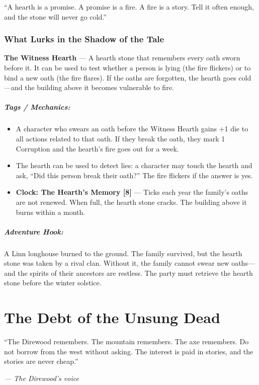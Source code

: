 \documentclass[9pt,a5paper]{extbook}
\begin{document}
``A hearth is a promise. A promise is a fire. A fire is a story. Tell it often enough, and the stone will never go cold.''

\subsection*{What Lurks in the Shadow of the Tale}

\textbf{The Witness Hearth} --- A hearth stone that remembers every oath sworn before it. It can be used to test whether a person is lying (the fire flickers) or to bind a new oath (the fire flares). If the oaths are forgotten, the hearth goes cold---and the building above it becomes vulnerable to fire.

\paragraph{Tags / Mechanics:}
\begin{itemize}
    \item A character who swears an oath before the Witness Hearth gains +1 die to all actions related to that oath. If they break the oath, they mark 1 Corruption and the hearth's fire goes out for a week.
    \item The hearth can be used to detect lies: a character may touch the hearth and ask, ``Did this person break their oath?'' The fire flickers if the answer is yes.
    \item \textbf{Clock: The Hearth's Memory [8]} --- Ticks each year the family's oaths are not renewed. When full, the hearth stone cracks. The building above it burns within a month.
\end{itemize}

\paragraph{Adventure Hook:}
A Linn longhouse burned to the ground. The family survived, but the hearth stone was taken by a rival clan. Without it, the family cannot swear new oaths---and the spirits of their ancestors are restless. The party must retrieve the hearth stone before the winter solstice.

\clearpage

\chapter{The Debt of the Unsung Dead}

\epigraph{``The Direwood remembers. The mountain remembers. The axe remembers. Do not borrow from the west without asking. The interest is paid in stories, and the stories are never cheap.''}{\textit{--- The Direwood's voice}}
\end{document}
